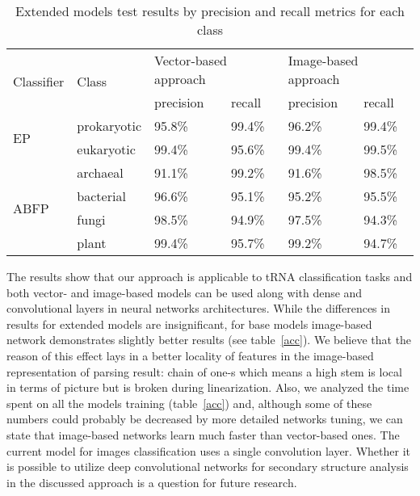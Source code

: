 \begin{table}[h]
\centering
\caption{Extended models test results by precision and recall metrics for each class}
\begin{tabular}{|l||l|l|l|l|l|}
\hline
\multirow{2}{*}{Classifier} & \multirow{2}{*}{Class} & \multicolumn{2}{l|}{Vector-based approach} & \multicolumn{2}{l|}{Image-based approach} \\ \cline{3-6} 
                            &                        & precision         & recall        & precision        & recall        \\ \hline \hline
\multirow{2}{*}{EP}         & prokaryotic            & 95.8\%            & 99.4\%        & 96.2\%           & 99.4\%        \\ \cline{2-6} 
                            & eukaryotic             & 99.4\%            & 95.6\%        & 99.4\%           & 99.5\%        \\ \hline \hline
\multirow{4}{*}{ABFP}       & archaeal               & 91.1\%            & 99.2\%        & 91.6\%           & 98.5\%        \\ \cline{2-6} 
                            & bacterial              & 96.6\%            & 95.1\%        & 95.2\%           & 95.5\%        \\ \cline{2-6} 
                            & fungi                  & 98.5\%            & 94.9\%        & 97.5\%           & 94.3\%        \\ \cline{2-6} 
                            & plant                  & 99.4\%            & 95.7\%        & 99.2\%           & 94.7\%        \\ \hline
\end{tabular}
\label{pe}
\end{table}

The results show that our approach is applicable to tRNA classification tasks and both vector- and image-based models can be used along with dense and convolutional layers in neural networks architectures.
While the differences in results for extended models are insignificant, for base models image-based network demonstrates slightly better results (see table~\ref{acc}).
We believe that the reason of this effect lays in a better locality of features in the image-based representation of parsing result: chain of one-s which means a high stem is local in terms of picture but is broken during linearization. 
Also, we analyzed the time spent on all the models training (table~\ref{acc}) and, although some of these numbers could probably be decreased by more detailed networks tuning, we can state that image-based networks learn much faster than vector-based ones.
The current model for images classification uses a single convolution layer.
Whether it is possible to utilize deep convolutional networks for secondary structure analysis in the discussed approach is a question for future research.

